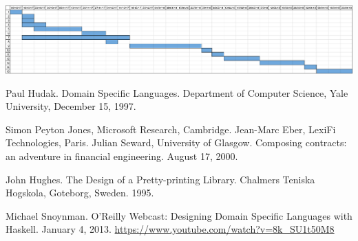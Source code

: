 \documentclass[12pt]{article}
\begin{document}
    \includegraphics[width=\textwidth,keepaspectratio]{gantt_chart.jpg}
    
    \begin{thebibliography}{4}
    
        Paul Hudak. Domain Specific Languages. Department of Computer
        Science, Yale University, December 15, 1997.

        Simon Peyton Jones, Microsoft Research, Cambridge.
        Jean-Marc Eber, LexiFi Technologies, Paris. Julian Seward,
        University of Glasgow. Composing contracts: an adventure in
        financial engineering. August 17, 2000.

        John Hughes. The Design of a Pretty-printing Library.
        Chalmers Teniska Hogskola, Goteborg, Sweden. 1995.

        Michael Snoynman. O'Reilly Webcast: Designing Domain Specific
        Languages with Haskell. January 4, 2013.
        \url{https://www.youtube.com/watch?v=8k_SU1t50M8}

    \end{thebibliography}
\end{document}
